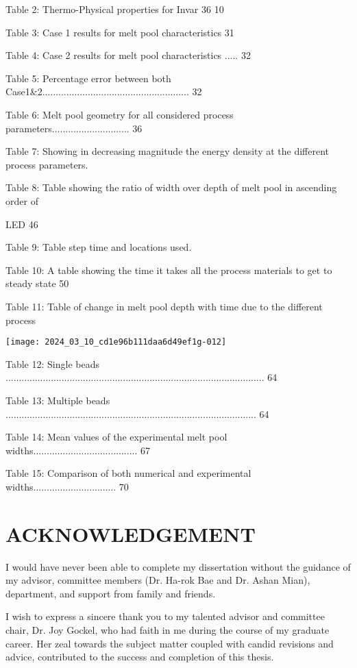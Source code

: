\documentclass[10pt]{article}
\begin{document}
Table 2: Thermo-Physical properties for Invar 36 10

Table 3: Case 1 results for melt pool characteristics 31

Table 4: Case 2 results for melt pool characteristics ..... 32

Table 5: Percentage error between both Case1\&2....................................................... 32

Table 6: Melt pool geometry for all considered process parameters............................. 36

Table 7: Showing in decreasing magnitude the energy density at the different process parameters.

Table 8: Table showing the ratio of width over depth of melt pool in ascending order of

LED 46

Table 9: Table step time and locations used.

Table 10: A table showing the time it takes all the process materials to get to steady state 50

Table 11: Table of change in melt pool depth with time due to the different process

\begin{center}
\texttt{[image: 2024\_03\_10\_cd1e96b111daa6d49ef1g-012]}
\end{center}

Table 12: Single beads ................................................................................................. 64

Table 13: Multiple beads .............................................................................................. 64

Table 14: Mean values of the experimental melt pool widths....................................... 67

Table 15: Comparison of both numerical and experimental widths............................... 70

\section*{ACKNOWLEDGEMENT}
I would have never been able to complete my dissertation without the guidance of my advisor, committee members (Dr. Ha-rok Bae and Dr. Ashan Mian), department, and support from family and friends.

I wish to express a sincere thank you to my talented advisor and committee chair, Dr. Joy Gockel, who had faith in me during the course of my graduate career. Her zeal towards the subject matter coupled with candid revisions and advice, contributed to the success and completion of this thesis.
\end{document}
